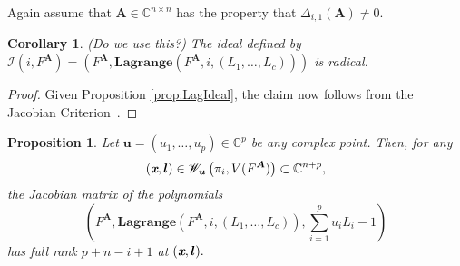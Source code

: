 \documentclass[a4paper]{article}
\def\sI{\mathscr{I}}
\def\mA{{\bm A}}
\def\ub{{\bm u}}
\def\lb{{\bm l}}
\def\xb{\textit{\textbf{x}}}
\def\C{\mathbb{C}}
\def\lagFA{{\bm{Lagrange}}(F^{\mA},i,(L_1,\hdots,L_c))}
\def\udl{\sum_{i=1}^pu_iL_i}
\newtheorem{corollary}[theorem]{Corollary}
\newtheorem{prop}[theorem]{Proposition}
\begin{document}
    Again assume that $\mA \in \C^{n \times n}$ has the property that $\Delta_{i,1}(\mA) \not = 0.$    
    \begin{corollary} (Do we use this?)
     The ideal defined by $\sI(i,F^{\mA}) = \left(F^{\mA},\lagFA\right)$ is radical.
    \end{corollary}
    \begin{proof}
    Given Proposition \ref{prop:LagIdeal}, the claim now follows from the Jacobian Criterion~\cite[Corollary 16.20]{ECA}.
    \end{proof}
    \begin{prop}\label{prop:RadLagPolarV}
     Let $\ub = (u_1,\hdots,u_p) \in \C^p$ be any complex point. Then, for any \[(\xb,\lb)\in \mathscr{W}_{\ub}\left(\pi_i,V(F^{\mA})\right) \subset \C^{n+p},\] the Jacobian matrix of the polynomials
     \[
    \left( F^{\mA},\lagFA,\udl-1\right) 
    \]
 has full rank $p+n-i+1$ at $(\xb,\lb).$ 
    \end{prop}
\end{document}
